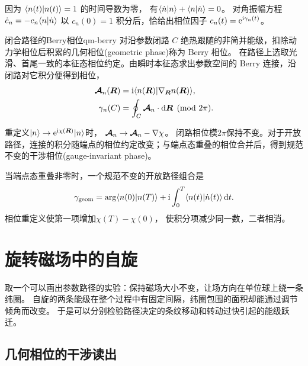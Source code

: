 因为 $\langle n(t)\vert n(t)\rangle = 1$ 的时间导数为零，
有$\langle\dot n\vert n\rangle + \langle n\vert\dot n\rangle = 0$。
对角振幅方程 $\dot c_n = -c_n\langle n\vert\dot n\rangle$ 以 $c_n(0) = 1$ 积分后，恰给出相位因子 $c_n(t) = \mathop{}\!\mathrm{e}^{\mathrm{i}\gamma_n(t)}$。

\begin{definition}{闭合路径的Berry相位}{qm-berry}
    对沿参数闭路 $C$ 绝热跟随的非简并能级，扣除动力学相位后积累的几何相位(geometric phase)称为 Berry 相位。
    在路径上选取光滑、首尾一致的本征态相位约定。由瞬时本征态求出参数空间的 Berry 连接，沿闭路对它积分便得到相位，
    \begin{subequations}
        \begin{align}
            \bm{\mathcal A}_n(\bm R) &= \mathrm{i}\langle n(\bm R)\vert\nabla_{\bm R}n(\bm R)\rangle,\\
            \gamma_n(C) &= \oint_C\bm{\mathcal A}_n \cdot \mathop{}\!\mathrm{d}\bm R\pmod{2\pi}.
        \end{align}
    \end{subequations}
\end{definition}

重定义$\lvert n\rangle \to \mathop{}\!\mathrm{e}^{\mathrm{i}\chi(\bm R)}\lvert n\rangle$时，
$\bm{\mathcal A}_n \to \bm{\mathcal A}_n - \nabla\chi$。
闭路相位模$2\pi$保持不变。对于开放路径，连接的积分随端点的相位约定改变；与端点态重叠的相位合并后，得到规范不变的干涉相位(gauge-invariant phase)。

\begin{remark}[开放路径的端点贡献]
当端点态重叠非零时，一个规范不变的开放路径组合是
\begin{equation}
    \gamma_{\mathrm{geom}}
    = \arg\langle n(0)\vert n(T)\rangle
    + \mathrm{i}\int_0^T\langle n(t)\vert\dot n(t)\rangle\mathop{}\!\mathrm{d} t.
\end{equation}
相位重定义使第一项增加$\chi(T) - \chi(0)$，
使积分项减少同一数，二者相消。
\end{remark}

\section{旋转磁场中的自旋}
取一个可以画出参数路径的实验：保持磁场大小不变，让场方向在单位球上绕一条纬圈。
自旋的两条能级在整个过程中有固定间隔，纬圈包围的面积却能通过调节倾角而改变。
于是可以分别检验路径决定的条纹移动和转动过快引起的能级跃迁。

\subsection{几何相位的干涉读出}
\label{ss:berry-readout}

